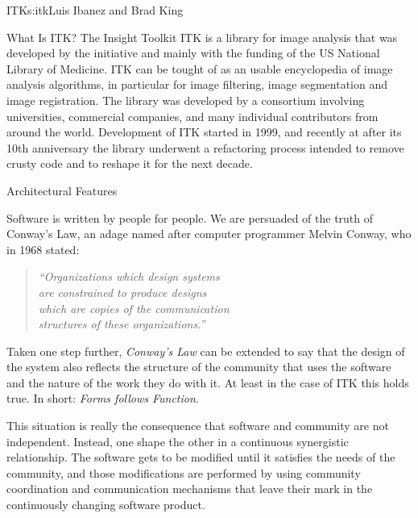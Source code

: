 \begin{aosachapter}{ITK}{s:itk}{Luis Ibanez and Brad King}


\begin{aosasect1}{What Is ITK?}
The Insight Toolkit ITK is a library for image analysis that was developed by
the initiative and mainly with the funding of the US National Library of
Medicine. ITK can be tought of as an usable encyclopedia of image analysis
algorithms, in particular for image filtering, image segmentation and image
registration. The library was developed by a consortium involving universities,
commercial companies, and many individual contributors from around the world.
Development of ITK started in 1999, and recently at after its 10th anniversary
the library underwent a refactoring process intended to remove crusty code and
to reshape it for the next decade.
\end{aosasect1}

\begin{aosasect1}{Architectural Features}

Software is written by people for people. We are persuaded of the truth of Conway's Law,
an adage named after computer programmer Melvin Conway, who in 1968 stated:

\begin{center}
\begin{quotation}
\emph{
``Organizations which design systems\\
are constrained to produce designs\\
which are copies of the communication\\
structures of these organizations.''
}
\end{quotation}
\end{center}

Taken one step further, \emph{Conway's Law} can be extended to say that the
design of the system also reflects the structure of the community that uses the
software and the nature of the work they do with it. At least in the case of
ITK this holds true. In short: \emph{Forms follows Function}.

This situation is really the consequence that software and community are not
independent. Instead, one shape the other in a continuous synergistic
relationship. The software gets to be modified until it satisfies the needs of
the community, and those modifications are performed by using community
coordination and communication mechanisms that leave their mark in the
continuously changing software product.


\end{aosasect1}
\end{aosachapter}
